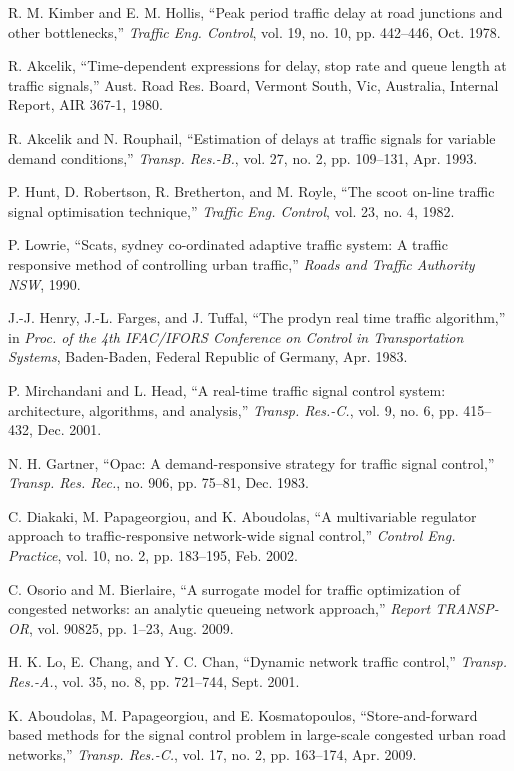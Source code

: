 \documentclass[conference]{IEEEtran}
\begin{document}
\begin{thebibliography}{}
 R. M. Kimber and E. M. Hollis, ``Peak period traffic delay at road junctions and other bottlenecks,'' {\em Traffic Eng. Control}, vol. 19, no. 10, pp. 442--446, Oct. 1978.

 R. Akcelik, ``Time-dependent expressions for delay, stop rate and queue length at traffic signals,''  Aust. Road Res. Board, Vermont South, Vic, Australia, Internal Report, AIR 367-1, 1980.

 R. Akcelik and N. Rouphail, ``Estimation of delays at traffic signals for variable demand conditions,'' {\em Transp. Res.-B.}, vol. 27, no. 2, pp. 109--131, Apr. 1993.

 P. Hunt, D. Robertson, R. Bretherton, and M. Royle, ``The scoot on-line traffic signal optimisation technique,'' {\em Traffic Eng. Control}, vol. 23, no. 4, 1982.

 P. Lowrie, ``Scats, sydney co-ordinated adaptive traffic system: A traffic
responsive method of controlling urban traffic,'' {\em Roads and Traffic Authority NSW}, 1990.

 J.-J. Henry, J.-L. Farges, and J. Tuffal, ``The prodyn real time traffic algorithm,'' in {\em Proc. of the 4th IFAC/IFORS Conference on Control in Transportation Systems}, Baden-Baden, Federal Republic of Germany, Apr. 1983.

 P. Mirchandani and L. Head, ``A real-time traffic signal control system: architecture, algorithms, and analysis,'' {\em Transp. Res.-C.}, vol. 9, no. 6, pp. 415--432, Dec. 2001.

 N. H. Gartner, ``Opac: A demand-responsive strategy for traffic signal
control,'' {\em Transp. Res. Rec.}, no. 906, pp. 75--81, Dec. 1983.

 C. Diakaki, M. Papageorgiou, and K. Aboudolas, ``A multivariable regulator approach to traffic-responsive network-wide signal control,'' {\em Control Eng. Practice}, vol. 10, no. 2, pp. 183--195, Feb. 2002.

 C. Osorio and M. Bierlaire, ``A surrogate model for traffic optimization of congested networks: an analytic queueing network approach,'' {\em Report TRANSP-OR}, vol. 90825, pp. 1--23, Aug. 2009.

 H. K. Lo, E. Chang, and Y. C. Chan, ``Dynamic network traffic control,'' {\em Transp. Res.-A.}, vol. 35, no. 8, pp. 721--744, Sept. 2001.

 K. Aboudolas, M. Papageorgiou, and E. Kosmatopoulos, ``Store-and-forward based methods for the signal control problem in large-scale congested urban road networks,'' {\em Transp. Res.-C.}, vol. 17, no. 2, pp. 163--174, Apr. 2009.


\end{thebibliography}
\end{document}
